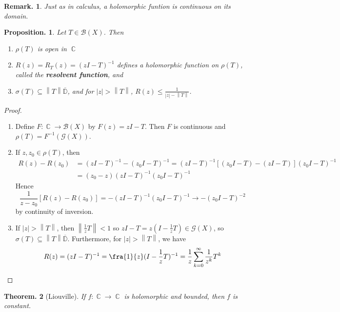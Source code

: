 \documentclass[11pt, a4paper]{memoir}
\DeclareMathOperator{\C}{{\mathbb{C}}}
\newcommand{\norm}[1]{\ensuremath{\left\lVert#1\right\rVert}}
\theoremstyle{change}
\newtheorem{theorem}{Theorem.}[section]
\newtheorem{proposition}[theorem]{Proposition.}
\theoremstyle{plain}
\theoremstyle{nonumberplain}
\newtheorem{remark}{Remark.}
\newtheorem{proof}{Proof}
\numberwithin{equation}{section}
\begin{document}
\begin{remark}
    Just as in calculus, a holomorphic funtion is continuous on its domain.
\end{remark}
\begin{proposition}
    Let $T\in\mathcal{B}(X)$.
    Then
    \begin{enumerate}[nl,r]
        \item $\rho(T)$ is open in $\C$
        \item $R(z)=R_T(z)=(zI-T)^{-1}$ defines a holomorphic function on $\rho(T)$, called the \textbf{resolvent function}, and
        \item $\sigma(T)\subseteq\norm{T}\overline{\mathbb{D}}$, and for $|z|>\norm{T}$, $R(z)\leq\frac{1}{|z|-\norm{T}}$.
    \end{enumerate}
\end{proposition}
\begin{proof}
    \begin{enumerate}[nl,r]
        \item Define $F:\C\to\mathcal{B}(X)$ by $F(z)=zI-T$.
            Then $F$ is continuous and $\rho(T)=F^{-1}(\mathcal{G}(X))$.
        \item If $z,z_0\in\rho(T)$, then
            \begin{align*}
                R(z)-R(z_0) &= (zI-T)^{-1}-(z_0I-T)^{-1}=(zI-T)^{-1}[(z_0I-T)-(zI-T)](z_0I-T)^{-1}\\
                            &= (z_0-z)(zI-T)^{-1}(z_0I-T)^{-1}
            \end{align*}
            Hence
            \begin{equation*}
                \frac{1}{z-z_0}[R(z)-R(z_0)]=-(zI-T)^{-1}(z_0I-T)^{-1}\to -(z_0I-T)^{-2}
            \end{equation*}
            by continuity of inversion.
        \item If $|z|>\norm{T}$, then $\norm{\frac{1}{z}T}<1$ so $zI-T=z(I-\frac{1}{z}T)\in\mathcal{G}(X)$, so $\sigma(T)\subseteq\norm{T}\overline{\mathbb{D}}$.
            Furthermore, for $|z|>\norm{T}$, we have
            \begin{equation*}
                R(z)=(zI-T)^{-1}=\fra{1}{z}(I-\frac{1}{z}T)^{-1}=\frac{1}{z}\sum_{k=0}^\infty\frac{1}{z^k}T^k
            \end{equation*}
    \end{enumerate}
\end{proof}
\begin{theorem}[Liouville]
    If $f:\C\to\C$ is holomorphic and bounded, then $f$ is constant.
\end{theorem}
\end{document}

